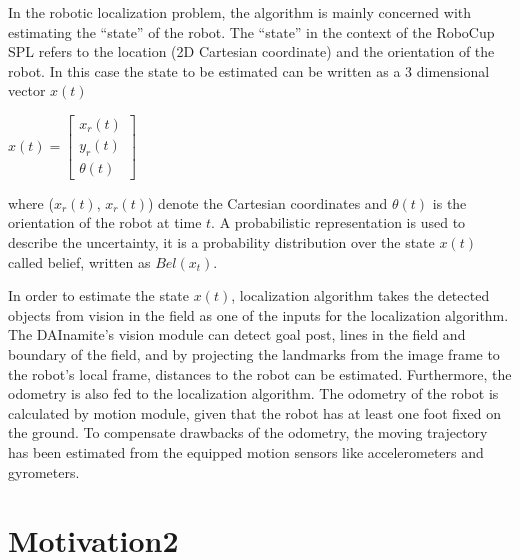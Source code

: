 In the robotic localization problem, the algorithm is mainly concerned with estimating the ``state'' of the robot. The ``state'' in the context of the RoboCup \gls{SPL} refers to the location (2D Cartesian coordinate) and the orientation of the robot. In this case the state to be estimated can be written as a 3 dimensional vector $x(t)$
\begin{center}
$x(t) =
 \begin{bmatrix}
  x_{r}(t) \\
  y_{r}(t) \\
  \theta(t) 
 \end{bmatrix} $ \\
\end{center}
where ($x_{r}(t)$, $x_{r}(t)$) denote the Cartesian coordinates and $\theta(t)$ is the orientation of the robot at time $t$. A probabilistic representation is used to describe the uncertainty, it is a probability distribution over the state $x(t)$ called belief, written as $Bel(x_{t})$.
 
In order to estimate the state $x(t)$, localization algorithm takes the detected objects from vision in the field as one of the inputs for the localization algorithm. The DAInamite's vision module can detect goal post, lines in the field and boundary of the field, and by projecting the landmarks from the image frame to the robot's local frame, distances to the robot can be estimated. Furthermore, the odometry is also fed to the localization algorithm. The odometry of the robot is calculated by motion module, given that the robot has at least one foot fixed on the ground. To compensate drawbacks of the odometry, the moving trajectory has been estimated from the equipped motion sensors like accelerometers and gyrometers.


\section{Motivation2\label{sec:moti}}
